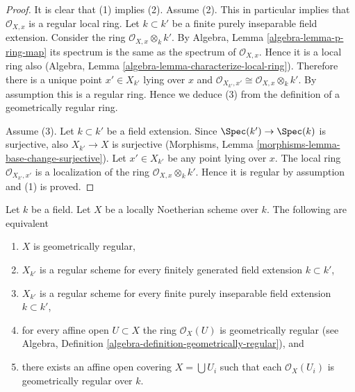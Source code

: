 \begin{proof}
It is clear that (1) implies (2).
Assume (2). This in particular implies that $\mathcal{O}_{X, x}$
is a regular local ring. Let $k \subset k'$ be a finite purely inseparable
field extension. Consider the ring $\mathcal{O}_{X, x} \otimes_k k'$.
By Algebra, Lemma \ref{algebra-lemma-p-ring-map}
its spectrum is the same as the spectrum of $\mathcal{O}_{X, x}$.
Hence it is a local ring also
(Algebra, Lemma \ref{algebra-lemma-characterize-local-ring}).
Therefore there is a unique point $x' \in X_{k'}$ lying over $x$
and $\mathcal{O}_{X_{k'}, x'} \cong \mathcal{O}_{X, x} \otimes_k k'$.
By assumption this is a regular ring. Hence we deduce (3)
from the definition of a geometrically regular ring.

\medskip\noindent
Assume (3). Let $k \subset k'$ be a field extension. Since
$\Spec(k') \to \Spec(k)$ is surjective, also
$X_{k'} \to X$ is surjective
(Morphisms, Lemma \ref{morphisms-lemma-base-change-surjective}).
Let $x' \in X_{k'}$ be any point lying over $x$.
The local ring $\mathcal{O}_{X_{k'}, x'}$
is a localization of the ring $\mathcal{O}_{X, x} \otimes_k k'$.
Hence it is regular by assumption and (1) is proved.
\end{proof}

\begin{lemma}
\label{lemma-geometrically-regular}
Let $k$ be a field.
Let $X$ be a locally Noetherian scheme over $k$.
The following are equivalent
\begin{enumerate}
\item $X$ is geometrically regular,
\item $X_{k'}$ is a regular scheme for every finitely generated field
extension $k \subset k'$,
\item $X_{k'}$ is a regular scheme for every finite purely inseparable
field extension $k \subset k'$,
\item for every affine open $U \subset X$ the ring $\mathcal{O}_X(U)$
is geometrically regular (see
Algebra, Definition \ref{algebra-definition-geometrically-regular}), and
\item there exists an affine open covering $X = \bigcup U_i$ such that
each $\mathcal{O}_X(U_i)$ is geometrically regular over $k$.
\end{enumerate}
\end{lemma}

